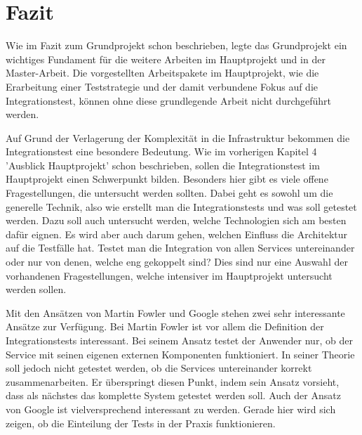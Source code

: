 \documentclass{llncs}
\begin{document}
\section{Fazit}
Wie im Fazit zum Grundprojekt schon beschrieben, legte das Grundprojekt ein wichtiges Fundament für die weitere Arbeiten im Hauptprojekt und in der Master-Arbeit. Die vorgestellten Arbeitspakete im Hauptprojekt, wie die Erarbeitung einer Teststrategie und der damit verbundene Fokus auf die Integrationstest, können ohne diese grundlegende Arbeit nicht durchgeführt werden.

Auf Grund der Verlagerung der Komplexität in die Infrastruktur bekommen die Integrationstest eine besondere Bedeutung. Wie im vorherigen Kapitel 4 'Ausblick Hauptprojekt' schon beschrieben, sollen die Integrationstest im Hauptprojekt einen Schwerpunkt bilden. Besonders hier gibt es viele offene Fragestellungen, die untersucht werden sollten. Dabei geht es sowohl um die generelle Technik, also wie erstellt man die Integrationstests und was soll getestet werden. Dazu soll auch untersucht werden, welche Technologien sich am besten dafür eignen. Es wird aber auch darum gehen, welchen Einfluss die Architektur auf die Testfälle hat. Testet man die Integration von allen Services untereinander oder nur von denen, welche eng gekoppelt sind? Dies sind nur eine Auswahl der vorhandenen Fragestellungen, welche intensiver im Hauptprojekt untersucht werden sollen.

Mit den Ansätzen von Martin Fowler und Google stehen zwei sehr interessante Ansätze zur Verfügung. Bei Martin Fowler ist vor allem die Definition der Integrationstests interessant. Bei seinem Ansatz testet der Anwender nur, ob der Service mit seinen eigenen externen Komponenten funktioniert. In seiner Theorie soll jedoch nicht getestet werden, ob die Services untereinander korrekt zusammenarbeiten. Er überspringt diesen Punkt, indem sein Ansatz vorsieht, dass als nächstes das komplette System getestet werden soll. Auch der Ansatz von Google ist vielversprechend interessant zu werden. Gerade hier wird sich zeigen, ob die Einteilung der Tests in der Praxis funktionieren. 



\end{document}
